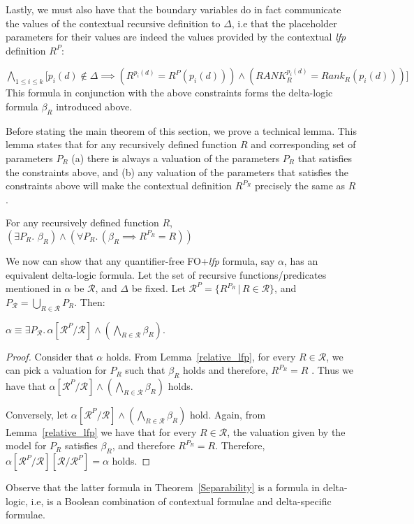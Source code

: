 Lastly, we must also have that the boundary variables do in fact communicate the values of the contextual recursive definition to $\Delta{}$, i.e that the placeholder parameters for their values are indeed the values provided by the contextual \textit{lfp} definition $R^{P}$:

$\bigwedge\limits_{1 \leq{} i \leq{} k} \big\lbrack{} p_i(d) \notin{} \Delta{} \implies{}  \left( R^{p_i(d)} =  R^{P}(p_i(d)) \right)  \land{} \left( \textit{RANK}_{R}^{p_i(d)} =  Rank_{R}(p_i(d)) \right) \big\rbrack{}$
This formula in conjunction with the above constraints forms the delta-logic formula $\beta_{R}$ introduced above.

Before stating the main theorem of this section, we prove a technical lemma. This lemma states that for any recursively defined function $R$ and corresponding set of parameters $P_R$ (a) there is always a valuation of the parameters $P_{R}$ that satisfies the constraints above, and (b) any valuation of the parameters that satisfies the constraints above will make the contextual definition $R^{P_R}$ precisely the same as $R$.   

\begin{lemma}
\label{relative_lfp}
For any recursively defined function $R$, $\left(\exists{}P_{R}.\,\,\beta_{R} \right) \land{} \left(\forall{}P_{R}.\,\left(\beta_{R} \implies{} R^{P_{R}} = R\right) \right)$
\end{lemma}

We now can show that any quantifier-free FO+\textit{lfp} formula, say $\alpha{}$, has an equivalent delta-logic formula. Let the set of recursive functions/predicates mentioned in $\alpha{}$ be $\mathcal{R}$, and $\Delta{}$ be fixed. Let $\mathcal{R}^{P} = \{ R^{P_{R}} \,|\, R \in{} \mathcal{R}\}$, and $P_{\mathcal{R}} = \bigcup\limits_{R \in{} \mathcal{R}}P_{R}$. Then:\\

\begin{theorem}[Separability]
\label{Separability}
$\alpha{} \equiv{} \exists{}P_{\mathcal{R}}.\, \alpha[\mathcal{R}^{P}/\mathcal{R}] \land{} \left( \bigwedge\limits_{R \in{} \mathcal{R}} \beta_{R} \right)$.
\end{theorem}

\begin{proof}
Consider that $\alpha{}$ holds. From Lemma~\ref{relative_lfp}, for every $R \in{} \mathcal{R}$, we can pick a valuation for $P_{R}$ such that $\beta_{R}$ holds and therefore, $R^{P_{R}} = R$ . Thus we have that $\alpha[\mathcal{R}^{P}/\mathcal{R}] \land{} \left( \bigwedge\limits_{R \in{} \mathcal{R}} \beta_{R}\right)$ holds.

Conversely, let $\alpha[\mathcal{R}^{P}/\mathcal{R}] \land{} \left( \bigwedge\limits_{R \in{} \mathcal{R}} \beta_{R} \right)$ hold. Again, from Lemma~\ref{relative_lfp} we have that for every $R \in{} \mathcal{R}$, the valuation given by the model for $P_{R}$ satisfies $\beta_{R}$, and therefore $R^{P_{R}} = R$. Therefore, $\alpha[\mathcal{R}^{P}/\mathcal{R}][\mathcal{R}/\mathcal{R}^{P}] = \alpha{}$ holds.
\end{proof}
Observe that the latter formula in Theorem~\ref{Separability} is a formula in delta-logic, i.e, is a Boolean combination of contextual formulae and delta-specific formulae.